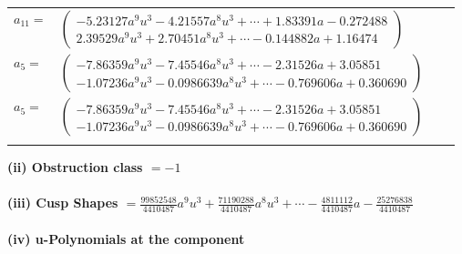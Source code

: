 \documentclass[1p]{elsarticle_modified}
\theoremstyle{definition}
\begin{document}
\begin{tabular}{m{7pt} m{180pt} m{7pt} m{180pt} }
\flushright $a_{11}=$&$\begin{pmatrix}-5.23127 a^{9} u^{3}-4.21557 a^{8} u^{3}+\cdots+1.83391 a-0.272488\\2.39529 a^{9} u^{3}+2.70451 a^{8} u^{3}+\cdots-0.144882 a+1.16474\end{pmatrix}$ \\
\flushright $a_{5}=$&$\begin{pmatrix}-7.86359 a^{9} u^{3}-7.45546 a^{8} u^{3}+\cdots-2.31526 a+3.05851\\-1.07236 a^{9} u^{3}-0.0986639 a^{8} u^{3}+\cdots-0.769606 a+0.360690\end{pmatrix}$\\ \flushright $a_{5}=$&$\begin{pmatrix}-7.86359 a^{9} u^{3}-7.45546 a^{8} u^{3}+\cdots-2.31526 a+3.05851\\-1.07236 a^{9} u^{3}-0.0986639 a^{8} u^{3}+\cdots-0.769606 a+0.360690\end{pmatrix}$\\&\end{tabular}
\flushleft \textbf{(ii) Obstruction class $= -1$}\\~\\
\flushleft \textbf{(iii) Cusp Shapes $= \frac{99852548}{4410487} a^9 u^3+\frac{71190288}{4410487} a^8 u^3+\cdots-\frac{4811112}{4410487} a-\frac{25276838}{4410487}$}\\~\\
\newpage\renewcommand{\arraystretch}{1}
\flushleft \textbf{(iv) u-Polynomials at the component}\newline \\
\end{document}
